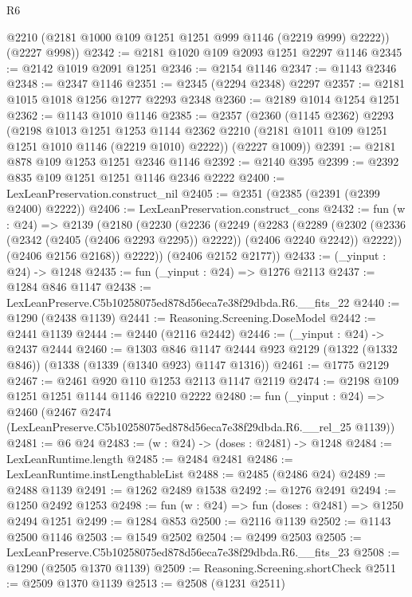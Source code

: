 \begin{lexlean}{R6}
\begin{coremodule}
        @2210
        (@2181 @1000 @109 @1251 @1251 @999 @1146 (@2219 @999) @2222))
      (@2227 @998))
@2342 := @2181 @1020 @109 @2093 @1251 @2297 @1146
@2345 := @2142 @1019 @2091 @1251
@2346 := @2154 @1146
@2347 := @1143 @2346
@2348 := @2347 @1146
@2351 := @2345 (@2294 @2348) @2297
@2357 := @2181 @1015 @1018 @1256 @1277 @2293 @2348
@2360 := @2189 @1014 @1254 @1251
@2362 := @1143 @1010 @1146
@2385 := @2357
    (@2360
      (@1145 @2362)
      @2293
      (@2198
        @1013
        @1251
        @1253
        @1144
        @2362
        @2210
        (@2181 @1011 @109 @1251 @1251 @1010 @1146 (@2219 @1010) @2222))
      (@2227 @1009))
@2391 := @2181 @878 @109 @1253 @1251 @2346 @1146
@2392 := @2140 @395
@2399 := @2392 @835 @109 @1251 @1251 @1146 @2346 @2222
@2400 := LexLeanPreservation.construct_nil
@2405 := @2351 (@2385 (@2391 (@2399 @2400) @2222))
@2406 := LexLeanPreservation.construct_cons
@2432 := fun (w : @24) =>
  @2139
    (@2180
      (@2230
        (@2236
          (@2249
            (@2283
              (@2289
                (@2302 (@2336 (@2342 (@2405 (@2406 @2293 @2295)) @2222)) (@2406 @2240 @2242))
                @2222))
            (@2406 @2156 @2168))
          @2222))
      (@2406 @2152 @2177))
@2433 := (_yinput : @24) -> @1248
@2435 := fun (_yinput : @24) => @1276 @2113
@2437 := @1284 @846 @1147
@2438 := LexLeanPreserve.C5b10258075ed878d56eca7e38f29dbda.R6.__fits_22
@2440 := @1290 (@2438 @1139)
@2441 := Reasoning.Screening.DoseModel
@2442 := @2441 @1139
@2444 := @2440 (@2116 @2442)
@2446 := (_yinput : @24) -> @2437 @2444
@2460 := @1303
    @846
    @1147
    @2444
    @923
    @2129
    (@1322 (@1332 @846))
    (@1338 (@1339 (@1340 @923) @1147 @1316))
@2461 := @1775 @2129
@2467 := @2461 @920 @110 @1253 @2113 @1147 @2119
@2474 := @2198 @109 @1251 @1251 @1144 @1146 @2210 @2222
@2480 := fun (_yinput : @24) =>
  @2460 (@2467 @2474 (LexLeanPreserve.C5b10258075ed878d56eca7e38f29dbda.R6.__rel_25 @1139))
@2481 := @6 @24
@2483 := (w : @24) -> (doses : @2481) -> @1248
@2484 := LexLeanRuntime.length
@2485 := @2484 @2481
@2486 := LexLeanRuntime.instLengthableList
@2488 := @2485 (@2486 @24)
@2489 := @2488 @1139
@2491 := @1262 @2489 @1538
@2492 := @1276 @2491
@2494 := @1250 @2492 @1253
@2498 := fun (w : @24) => fun (doses : @2481) => @1250 @2494 @1251
@2499 := @1284 @853
@2500 := @2116 @1139
@2502 := @1143 @2500 @1146
@2503 := @1549 @2502
@2504 := @2499 @2503
@2505 := LexLeanPreserve.C5b10258075ed878d56eca7e38f29dbda.R6.__fits_23
@2508 := @1290 (@2505 @1370 @1139)
@2509 := Reasoning.Screening.shortCheck
@2511 := @2509 @1370 @1139
@2513 := @2508 (@1231 @2511)

\end{coremodule}
\end{lexlean}
